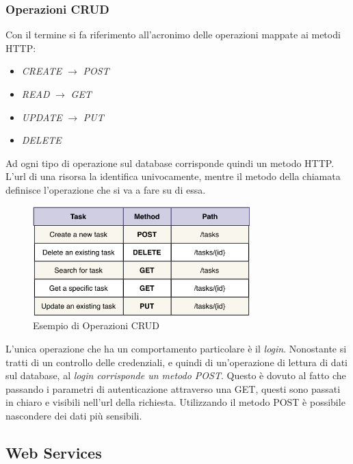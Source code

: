 \subsubsection{Operazioni CRUD}
Con il termine si fa riferimento all'acronimo delle operazioni mappate ai metodi HTTP:
\begin{itemize}
    \item \textit{CREATE} $\rightarrow$ \textit{POST} 
    \item \textit{READ} $\rightarrow$  \textit{GET} 
    \item \textit{UPDATE} $\rightarrow$ \textit{PUT}
    \item \textit{DELETE}
\end{itemize}

Ad ogni tipo di operazione sul database corrisponde quindi un metodo HTTP. L'url di una risorsa la identifica univocamente, mentre il metodo della chiamata definisce l'operazione che si va a fare su di essa.

\begin{figure}[H]
    \centering
    \includegraphics[width=0.75\textwidth]{images/01_11_rest_crud.pdf}
    \caption{Esempio di Operazioni CRUD}
    \label{fig:crudoperations}
\end{figure}

L'unica operazione che ha un comportamento particolare è il \emph{login}. Nonostante si tratti di un controllo delle credenziali, e quindi di un'operazione di lettura di dati sul database, al \textit{login corrisponde un metodo POST}. Questo è dovuto al fatto che passando i parametri di autenticazione attraverso una GET, questi sono passati in chiaro e visibili nell'url della richiesta. Utilizzando il metodo POST è possibile nascondere dei dati più sensibili.

\subsection{Web Services}

